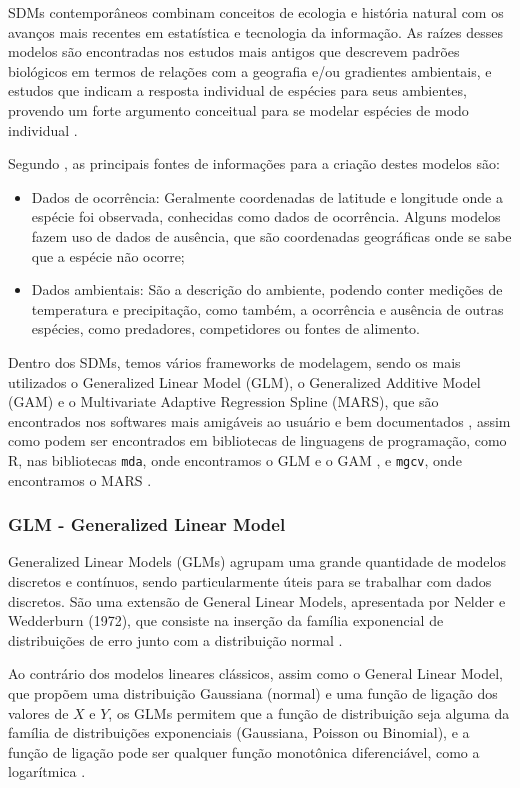 \documentclass[
    12pt,               %
    openright,          %
    oneside,            %
    a4paper,            %
    english,            %
    brazil              %
    ]{abntex2}
\begin{document}
SDMs contemporâneos combinam conceitos de ecologia e história natural com os avanços mais recentes em estatística e 
tecnologia da informação. As raízes desses modelos são encontradas nos estudos mais antigos que descrevem padrões biológicos 
em termos de relações com a geografia e/ou gradientes ambientais, e estudos que indicam a resposta individual de espécies 
para seus ambientes, provendo um forte argumento conceitual para se modelar espécies de modo individual \cite{speciesDistributionModels}.

Segundo \cite{tiposDados_sdm}, as principais fontes de informações para a criação destes modelos são: 
\begin{itemize}
    \item Dados de ocorrência: Geralmente coordenadas de latitude e longitude onde a espécie foi observada, conhecidas como
dados de ocorrência. Alguns modelos fazem uso de dados de ausência, que são coordenadas geográficas 
onde se sabe que a espécie não ocorre;
    \item Dados ambientais: São a descrição do ambiente, podendo conter medições de temperatura e precipitação, como
também, a ocorrência e ausência de outras espécies, como predadores, competidores ou fontes de alimento.
\end{itemize}

Dentro dos SDMs, temos vários frameworks de modelagem, sendo os mais utilizados o Generalized Linear Model (GLM), 
o Generalized Additive Model (GAM) e o Multivariate Adaptive Regression Spline (MARS), que são encontrados nos
softwares mais amigáveis ao usuário e bem documentados \cite{predPerform33models}, assim como podem ser encontrados em 
bibliotecas de linguagens de programação, como R, nas bibliotecas \lstinline|mda|, onde encontramos o GLM e o GAM \cite{mda},
e \lstinline|mgcv|, onde encontramos o MARS \cite{mgcv}.

\subsubsection{GLM - Generalized Linear Model}

Generalized Linear Models (GLMs) agrupam uma grande quantidade de modelos discretos e contínuos, sendo particularmente úteis 
para se trabalhar com dados discretos. São uma extensão de General Linear Models, apresentada por Nelder e Wedderburn 
(1972), que consiste na inserção da família exponencial de distribuições de erro junto com a distribuição normal \cite{GLM}.

Ao contrário dos modelos lineares clássicos, assim como o General Linear Model, que propõem uma distribuição Gaussiana (normal) 
e uma função de ligação dos valores de $X$ e $Y$, os GLMs permitem que a função de distribuição seja alguma da família de distribuições 
exponenciais (Gaussiana, Poisson ou Binomial), e a função de ligação pode ser qualquer função monotônica 
diferenciável, como a logarítmica \cite{GAMeGLM_especie_estudo}.
\end{document}
